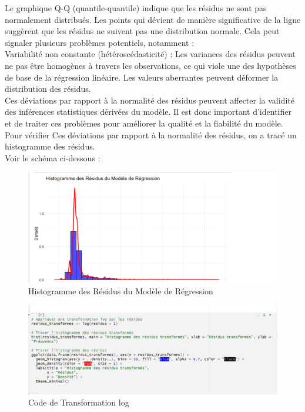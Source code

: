 \documentclass{report}
\begin{document}
Le graphique Q-Q (quantile-quantile) indique que les résidus ne sont pas normalement distribués. Les points qui dévient de manière significative de la ligne suggèrent que les résidus ne suivent pas une distribution normale. 
Cela peut signaler plusieurs problèmes potentiels, notamment :\\
Variabilité non constante (hétéroscédasticité) : Les variances des résidus peuvent ne pas être homogènes à travers les observations, ce qui viole une des hypothèses de base de la régression linéaire.
Les valeurs aberrantes peuvent déformer la distribution des résidus.\\

Ces déviations par rapport à la normalité des résidus peuvent affecter la validité des inférences statistiques dérivées du modèle. Il est donc important d'identifier et de traiter ces problèmes pour améliorer la qualité et la fiabilité du modèle.\\

Pour vérifier Ces déviations par rapport à la normalité des résidus, on a tracé un histogramme des résidus.  \\
Voir le schéma  ci-dessous :\\


\begin{figure}[H]
\centering
\includegraphics[width = 1
\linewidth]{regression.png}
\caption{Histogramme des Résidus du Modèle de Régression}
\end{figure}

\begin{figure}[H]
\centering
\includegraphics[width = 1
\linewidth]{logresidus.png}
\caption{Code de Transformation log}
\end{figure}
\end{document}
